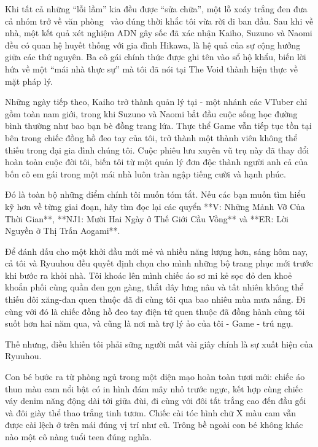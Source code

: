 \documentclass[../main.tex]{subfiles}
\begin{document}
Khi tất cả những ``lỗi lầm'' kia đều được ``sửa chữa'', một lỗ xoáy trắng đen đưa cả nhóm trở về văn phòng \hll\ vào đúng thời khắc tôi vừa rời đi ban đầu. Sau khi về nhà, một kết quả xét nghiệm ADN gây sốc đã xác nhận Kaiho, Suzuno và Naomi đều có quan hệ huyết thống với gia đình Hikawa, là hệ quả của sự cộng hưởng giữa các thứ nguyên. Ba cô gái chính thức được ghi tên vào sổ hộ khẩu, biến lời hứa về một ``mái nhà thực sự'' mà tôi đã nói tại The Void thành hiện thực về mặt pháp lý.


Những ngày tiếp theo, Kaiho trở thành quản lý tại \textit{\hls} - một nhánh các VTuber chỉ gồm toàn nam giới, trong khi Suzuno và Naomi bắt đầu cuộc sống học đường bình thường như bao bạn bè đồng trang lứa. Thực thể Game vẫn tiếp tục tồn tại bên trong chiếc đồng hồ đeo tay của tôi, trở thành một thành viên không thể thiếu trong đại gia đình chúng tôi. Cuộc phiêu lưu xuyên vũ trụ này đã thay đổi hoàn toàn cuộc đời tôi, biến tôi từ một quản lý đơn độc thành người anh cả của bốn cô em gái trong một mái nhà luôn tràn ngập tiếng cười và hạnh phúc.

Đó là toàn bộ những điểm chính tôi muốn tóm tắt. Nếu các bạn muốn tìm hiểu kỹ hơn về từng giai đoạn, hãy tìm đọc lại các quyển **V: Những Mảnh Vỡ Của Thời Gian**, **NJ1: Mười Hai Ngày ở Thế Giới Cầu Vồng** và **ER: Lời Nguyền ở Thị Trấn Aogami**.

Để đánh dấu cho một khởi đầu mới mẻ và nhiều năng lượng hơn, sáng hôm nay, cả tôi và Ryuuhou đều quyết định chọn cho mình những bộ trang phục mới trước khi bước ra khỏi nhà. Tôi khoác lên mình chiếc áo sơ mi kẻ sọc đỏ đen khoẻ khoắn phối cùng quần đen gọn gàng, thắt dây lưng nâu và tất nhiên không thể thiếu đôi xăng-đan quen thuộc đã đi cùng tôi qua bao nhiêu mùa mưa nắng. Đi cùng với đó là chiếc đồng hồ đeo tay điện tử quen thuộc đã đồng hành cùng tôi suốt hơn hai năm qua, và cũng là nơi mà trợ lý ảo của tôi - Game - trú ngụ.

Thế nhưng, điều khiến tôi phải sững người mất vài giây chính là sự xuất hiện của Ryuuhou.

Con bé bước ra từ phòng ngủ trong một diện mạo hoàn toàn tươi mới: chiếc áo thun màu cam nổi bật có in hình đám mây nhỏ trước ngực, kết hợp cùng chiếc váy denim năng động dài tới giữa đùi, đi cùng với đôi tất trắng cao đến đầu gối và đôi giày thể thao trắng tinh tươm. Chiếc cài tóc hình chữ X màu cam vẫn được cài lệch ở trên mái đúng vị trí như cũ. Trông bề ngoài con bé không khác nào một cô nàng tuổi teen đúng nghĩa.
\end{document}

